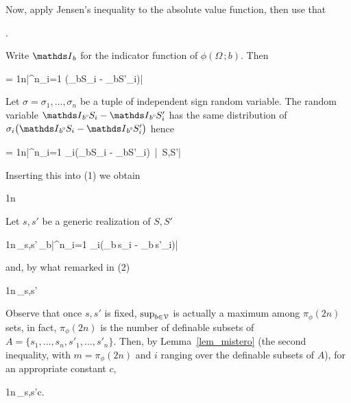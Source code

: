 \documentclass[scombinatorics.tex]{subfiles}
\begin{document}
{Now, apply Jensen's inequality to the absolute value function, then use that 

{\le}
{\Ex{}.}

Write $\Indicator_b$ for the indicator function of $\phi(\Omega\,;b)$.
Then

{=}
{\frac1n\bigg|\sum^n_{i=1} \Big(\Indicator_b\smallcirc S_i -  \Indicator_b\smallcirc S'_i\Big)\bigg|}

Let $\sigma=\sigma_1,\dots,\sigma_n$ be a tuple of independent sign random variable.
The random variable $\Indicator_b\smallcirc S_i -  \Indicator_b\smallcirc S'_i$ has the same distribution of $\sigma_i\big(\Indicator_b\smallcirc S_i -  \Indicator_b\smallcirc S'_i\big)$ hence

\ceq{}
{=}
{\frac1n\Ex\bigg|\sum^n_{i=1} \sigma_i\Big(\Indicator_b\smallcirc S_i -  \Indicator_b\smallcirc S'_i\Big)\ \Big|\ S,S'\bigg|}

Inserting this into (1) we obtain


{\le}
{\frac1n\,\Ex\bigg[\sup_{b\in\V}\Ex\bigg|\sum^n_{i=1} \sigma_i\Big(\Indicator_b\smallcirc S_i -  \Indicator_b\smallcirc S'_i\Big)\ \Big|\ S,S'\bigg|\bigg]}

Let $s,s'$ be a generic realization of $S,S'$


\ceq{}
{\le}
{\frac1n\,\sup_{s,s'}\,\sup_{b\in\V}\Ex\bigg|\sum^n_{i=1} \sigma_i\big(\Indicator_b\,s_i -  \Indicator_b\,s'_i\big)\bigg|}

and, by what remarked in (2)

\ceq{}
{\le}
{\frac1n\,\sup_{s,s'}\Ex\bigg[\sup_{b\in\V}\bigg|\sum^n_{i=1} \sigma_i\big(\Indicator_b\,s_i -  \Indicator_b\,s'_i\big)\bigg|\bigg]}


Observe that once $s,s'$ is fixed, $\sup_{b\in\EuScript V}$ is actually a maximum among $\pi_\phi(2n)$ sets, in fact, $\pi_\phi(2n)$ is the number of definable subsets of $A=\{s_1,\dots,s_n,s'_1,\dots,s'_n\}$.
Then, by Lemma~\ref{lem_mistero} (the second inequality, with $m =\pi_\phi(2n)$ and $i$ ranging over the definable subsets of $A$), for an appropriate constant $c$,

\ceq{}
{\le}
{\frac1n\,\sup_{s,s'}c.}

}
\end{document}

